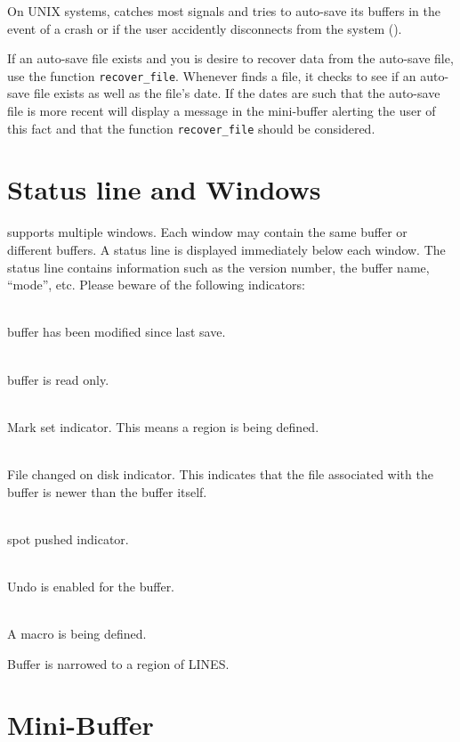  On UNIX systems, \jed{} catches most signals and tries to auto-save its
  buffers in the event of a crash or if the user accidently disconnects from
  the system ().

  If an auto-save file exists and you is desire to recover data from the
  auto-save file, use the function \verb|recover_file|.  Whenever \jed{} finds a
  file, it checks to see if an auto-save file exists as well as the file's
  date.  If the dates are such that the auto-save file is more recent \jed{}
  will display a message in the mini-buffer alerting the user of this fact
  and that the function \verb|recover_file| should be considered.

\section{Status line and Windows}

  \jed{} supports multiple windows.  Each window may contain the same buffer or
  different buffers.  A status line is displayed immediately below each
  window.  The status line contains information such as the \jed{} version
  number, the buffer name, ``mode'', etc.  Please beware of the following
  indicators:

   \var{**}\\
        buffer has been modified since last save.
        
   \var{\%\%}\\
        buffer is read only.
        
   \\
        Mark set indicator.  This means a region is being defined.
        
   \\
        File changed on disk indicator.  This indicates that the
        file associated with the buffer is newer than the buffer itself.
        
   \\
        spot pushed indicator.
        
   \var{+}\\
        Undo is enabled for the buffer.
        
   \var{[Macro]}\\
        A macro is being defined.
        
   \var{[Narrow]}
        Buffer is narrowed to a region of LINES.

\section{Mini-Buffer}

